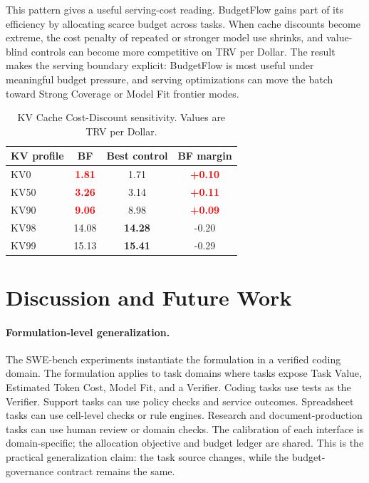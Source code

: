 \documentclass[sigconf,review,anonymous]{acmart}
\newcommand{\method}{BudgetFlow\xspace}
\newcommand{\trv}{TRV\xspace}
\newcommand{\taskvalue}{Task Value\xspace}
\newcommand{\tokencost}{Estimated Token Cost\xspace}
\newcommand{\modelfit}{Model Fit\xspace}
\newcommand{\verifier}{Verifier\xspace}
\newcommand{\pos}[1]{\textcolor{red}{\textbf{#1}}}
\newcommand{\ctrl}[1]{\textcolor{bfblue}{\textbf{#1}}}
\begin{document}
This pattern gives a useful serving-cost reading. \method gains part of its efficiency by allocating scarce budget across tasks. When cache discounts become extreme, the cost penalty of repeated or stronger model use shrinks, and value-blind controls can become more competitive on \trv per Dollar. The result makes the serving boundary explicit: BudgetFlow is most useful under meaningful budget pressure, and serving optimizations can move the batch toward Strong Coverage or Model Fit frontier modes.

\begin{table}[t]
\centering
\small
\begin{tabular}{lccc}
\toprule
KV profile & BF & Best control & BF margin \\
\midrule
KV0 & \pos{1.81} & 1.71 & \pos{+0.10} \\
KV50 & \pos{3.26} & 3.14 & \pos{+0.11} \\
KV90 & \pos{9.06} & 8.98 & \pos{+0.09} \\
KV98 & 14.08 & \ctrl{14.28} & -0.20 \\
KV99 & 15.13 & \ctrl{15.41} & -0.29 \\
\bottomrule
\end{tabular}
\caption{KV Cache Cost-Discount sensitivity. Values are \trv per Dollar.}
\label{tab:kv-sensitivity}
\end{table}

\section{Discussion and Future Work}
\label{sec:discussion}
\paragraph{Formulation-level generalization.}
The SWE-bench experiments instantiate the formulation in a verified coding domain. The formulation applies to task domains where tasks expose \taskvalue, \tokencost, \modelfit, and a \verifier. Coding tasks use tests as the \verifier. Support tasks can use policy checks and service outcomes. Spreadsheet tasks can use cell-level checks or rule engines. Research and document-production tasks can use human review or domain checks. The calibration of each interface is domain-specific; the allocation objective and budget ledger are shared. This is the practical generalization claim: the task source changes, while the budget-governance contract remains the same.
\end{document}
